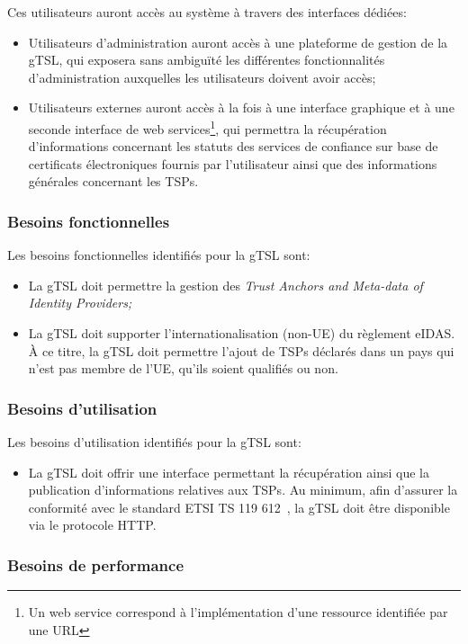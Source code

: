 \documentclass{tnreport}
\begin{document}
Ces utilisateurs auront accès au système à travers des interfaces dédiées:
\begin{itemize}
	\item Utilisateurs d'administration auront accès à une plateforme de gestion de la gTSL, qui exposera sans ambiguïté les différentes fonctionnalités d'administration auxquelles les utilisateurs doivent avoir accès;
	\item Utilisateurs externes auront accès à la fois à une interface graphique et à une seconde interface de web services\footnote{Un web service correspond à l'implémentation d'une ressource identifiée par une URL}, qui permettra la récupération d'informations concernant les statuts des services de confiance sur base de certificats électroniques fournis par l'utilisateur ainsi que des informations générales concernant les TSPs.
\end{itemize}

\subsubsection{Besoins fonctionnelles}

Les besoins fonctionnelles identifiés pour la gTSL sont:
\begin{itemize}
	\item La gTSL doit permettre la gestion des {\em Trust Anchors and Meta-data of Identity Providers;}
	\item La gTSL doit supporter l'internationalisation (non-UE) du règlement eIDAS. À ce titre, la gTSL doit permettre l'ajout de TSPs déclarés dans un pays qui n'est pas membre de l'UE, qu'ils soient qualifiés ou non.
\end{itemize}

\subsubsection{Besoins d'utilisation}

Les besoins d'utilisation identifiés pour la gTSL sont:
\begin{itemize}
	\item La gTSL doit offrir une interface permettant la récupération ainsi que la publication d'informations relatives aux TSPs. Au minimum, afin d'assurer la conformité avec le standard ETSI TS 119 612~\cite{ETSITS119612}, la gTSL doit être disponible via le protocole HTTP.
\end{itemize}

\subsubsection{Besoins de performance}
\end{document}
